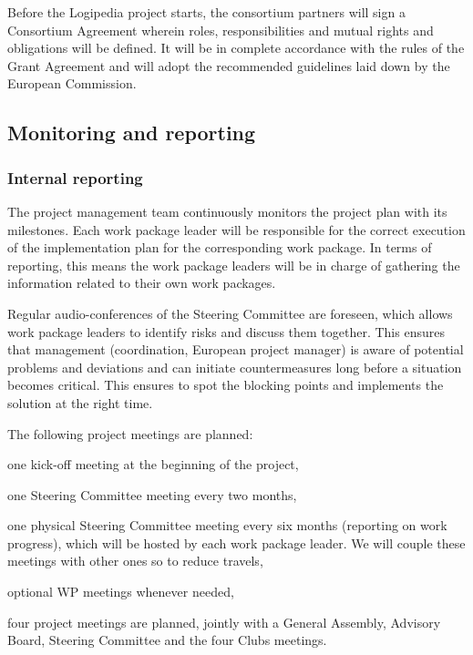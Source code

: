 Before the Logipedia project starts, the consortium partners will sign
a Consortium Agreement wherein roles, responsibilities and mutual
rights and obligations will be defined. It will be in complete
accordance with the rules of the Grant Agreement and will adopt
the recommended guidelines laid down by the European Commission.

\subsection*{Monitoring and reporting}

\subsubsection*{Internal reporting}

The project management team continuously monitors the project plan
with its milestones. Each work package leader will be
responsible for the correct execution of the implementation plan for
the corresponding work package. In terms of reporting, this means the work package leaders
will be in charge of gathering the information related to their own
work packages.

Regular audio-conferences of the Steering Committee are foreseen,
which allows work package leaders to identify risks and
discuss them together. This ensures that management (coordination,
European project manager) is aware of potential problems and
deviations and can initiate countermeasures long before a situation
becomes critical. This ensures to spot the blocking points and implements
the solution at the right time.

The following project meetings are planned:

\begin{compactitem}
\item one kick-off meeting at the beginning of the project, 
\item one Steering Committee meeting every two months,
\item one physical Steering Committee meeting every six months
  (reporting on work progress), which will be hosted by each work package 
  leader. We will couple these meetings with other ones so to reduce
  travels,
\item optional WP meetings whenever needed, 
\item four project meetings are planned, jointly with a General Assembly,
  Advisory Board, Steering Committee and the four Clubs meetings.
\end{compactitem}

